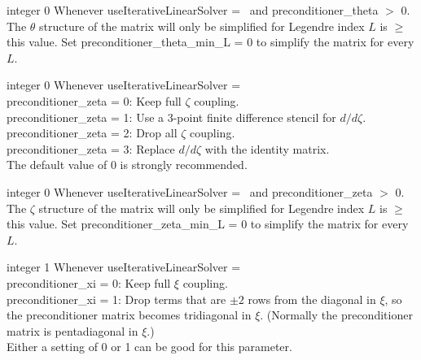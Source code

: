 \myhrule

{integer}
{0}
{Whenever {\ttfamily useIterativeLinearSolver} = \true~and {\ttfamily preconditioner\_theta} $>$ 0.}
{The $\theta$ structure of the matrix will only be simplified for Legendre index $L$ is $\ge$ this value.
Set {\ttfamily preconditioner\_theta\_min\_L} = 0 to simplify the matrix for every $L$.
}

\myhrule

{integer}
{0}
{Whenever {\ttfamily useIterativeLinearSolver} = \true}
{\\
{\ttfamily preconditioner\_zeta} = 0: Keep full $\zeta$ coupling.\\

{\ttfamily preconditioner\_zeta} = 1: Use a 3-point finite difference stencil for $d/d\zeta$.\\

{\ttfamily preconditioner\_zeta} = 2: Drop all $\zeta$ coupling.\\

{\ttfamily preconditioner\_zeta} = 3: Replace $d/d\zeta$ with the identity matrix.\\

The default value of 0 is strongly recommended.}

\myhrule

{integer}
{0}
{Whenever {\ttfamily useIterativeLinearSolver} = \true~and {\ttfamily preconditioner\_zeta} $>$ 0.}
{The $\zeta$ structure of the matrix will only be simplified for Legendre index $L$ is $\ge$ this value.
Set {\ttfamily preconditioner\_zeta\_min\_L} = 0 to simplify the matrix for every $L$.
}

\myhrule

{integer}
{1}
{Whenever {\ttfamily useIterativeLinearSolver} = \true}
{\\
{\ttfamily preconditioner\_xi} = 0: Keep full $\xi$ coupling.\\

{\ttfamily preconditioner\_xi} = 1: Drop terms that are $\pm 2$ rows from the diagonal in $\xi$, 
      so the preconditioner matrix becomes tridiagonal in $\xi$.
(Normally the preconditioner matrix is pentadiagonal in $\xi$.)\\

Either a setting of 0 or 1 can be good for this parameter.}

\myhrule

